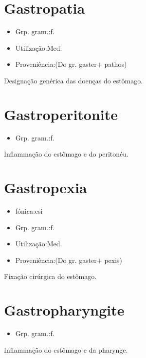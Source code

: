 \section{Gastropatia}
\begin{itemize}
\item {Grp. gram.:f.}
\end{itemize}
\begin{itemize}
\item {Utilização:Med.}
\end{itemize}
\begin{itemize}
\item {Proveniência:(Do gr. \textunderscore gaster\textunderscore  + \textunderscore pathos\textunderscore )}
\end{itemize}
Designação genérica das doenças do estômago.
\section{Gastroperitonite}
\begin{itemize}
\item {Grp. gram.:f.}
\end{itemize}
Inflammação do estômago e do peritonéu.
\section{Gastropexia}
\begin{itemize}
\item {fónica:csi}
\end{itemize}
\begin{itemize}
\item {Grp. gram.:f.}
\end{itemize}
\begin{itemize}
\item {Utilização:Med.}
\end{itemize}
\begin{itemize}
\item {Proveniência:(Do gr. \textunderscore gaster\textunderscore  + \textunderscore pexis\textunderscore )}
\end{itemize}
Fixação cirúrgica do estômago.
\section{Gastropharyngite}
\begin{itemize}
\item {Grp. gram.:f.}
\end{itemize}
Inflammação do estômago e da pharynge.
